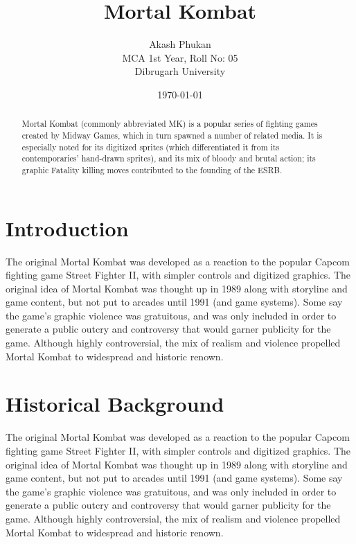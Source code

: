 \documentclass[12pt]{article}
\title{\textbf{Mortal Kombat}}
\author{Akash Phukan \\ MCA 1st Year, Roll No: 05 \\ Dibrugarh University}
\date{\today}
\begin{document}
\maketitle

\begin{abstract}
Mortal Kombat (commonly abbreviated MK) is a popular series of fighting games created by Midway Games, which in turn spawned a number of related media. It is especially noted for its digitized sprites (which differentiated it from its contemporaries' hand-drawn sprites), and its mix of bloody and brutal action; its graphic Fatality killing moves contributed to the founding of the ESRB.
\end{abstract}

\section{Introduction}
The original Mortal Kombat was developed as a reaction to the popular Capcom fighting game Street Fighter II, with simpler controls and digitized graphics. The original idea of Mortal Kombat was thought up in 1989 along with storyline and game content, but not put to arcades until 1991 (and game systems). Some say the game's graphic violence was gratuitous, and was only included in order to generate a public outcry and controversy that would garner publicity for the game. Although highly controversial, the mix of realism and violence propelled Mortal Kombat to widespread and historic renown.

\section{Historical Background}
The original Mortal Kombat was developed as a reaction to the popular Capcom fighting game Street Fighter II, with simpler controls and digitized graphics. The original idea of Mortal Kombat was thought up in 1989 along with storyline and game content, but not put to arcades until 1991 (and game systems). Some say the game's graphic violence was gratuitous, and was only included in order to generate a public outcry and controversy that would garner publicity for the game. Although highly controversial, the mix of realism and violence propelled Mortal Kombat to widespread and historic renown.
\end{document}
